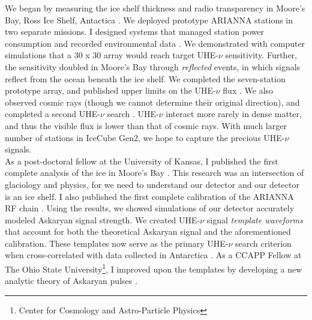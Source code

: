 \documentclass[../../main.tex]{subfiles}
\begin{document}
We began by measuring the ice shelf thickness and radio transparency in Moore's Bay, Ross Ice Shelf, Antactica \cite{icrc}.  We deployed prototype ARIANNA stations in two separate missions.  I designed systems that managed station power consumption and recorded environmental data \cite{10.1109/tns.2015.2468182} \cite{10.1016/j.nima.2010.09.032}.  We demonstrated with computer simulations that a 30 x 30 array would reach target UHE-$\nu$ sensitivity.  Further, the sensitivity doubled in Moore's Bay through \textit{reflected} events, in which signals reflect from the ocean beneath the ice shelf.  We completed the seven-station prototype array, and published upper limits on the UHE-$\nu$ flux \cite{10.1016/j.astropartphys.2015.04.002}.  We also observed cosmic rays \cite{cr} (though we cannot determine their original direction), and completed a second UHE-$\nu$ search \cite{4_5}.  UHE-$\nu$ interact more rarely in dense matter, and thus the visible flux is lower than that of cosmic rays.  With much larger number of stations in IceCube Gen2, we hope to capture the precious UHE-$\nu$ signals.
\\
\vspace{0.25cm}
As a post-doctoral fellow at the University of Kansas, I published the first complete analysis of the ice in Moore's Bay \cite{10.3189/2015jog14j214}.  This research was an intersection of glaciology and physics, for we need to understand our detector and our detector is an ice shelf.  I also published the first complete calibration of the ARIANNA RF chain \cite{10.1016/j.astropartphys.2014.09.002}. Using the results, we showed simulations of our detector accurately modeled Askaryan signal strength.  We created UHE-$\nu$ signal \textit{template waveforms} that account for both the theoretical Askaryan signal and the aforementioned calibration.  These templates now serve as the primary UHE-$\nu$ search criterion when cross-correlated with data collected in Antarctica \cite{10.1016/j.astropartphys.2015.04.002} \cite{4_5}.  As a CCAPP Fellow at The Ohio State University\footnote{Center for Cosmology and Astro-Particle Physics}, I improved upon the templates by developing a new analytic theory of Askaryan pulses \cite{10.1016/j.astropartphys.2017.03.008}.
\\
\vspace{0.25cm}
\end{document}
